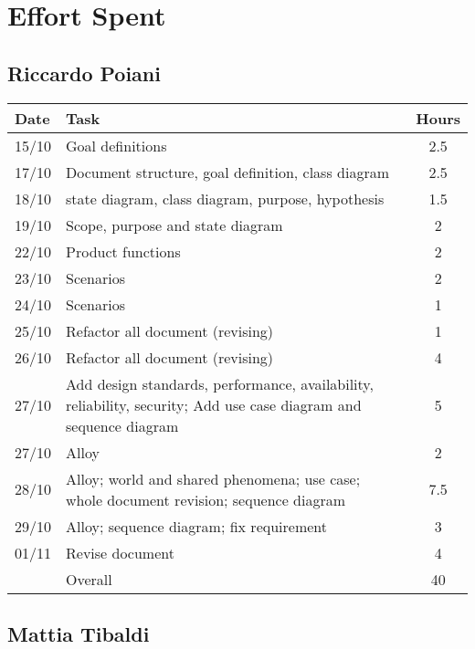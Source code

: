 \section{Effort Spent}

\subsection{Riccardo Poiani}

\begin{table}[H]
\begin{tabularx}{\textwidth}{|l|X|c|}
\hline
\rowcolor[HTML]{C0C0C0} 
Date & Task & Hours\\ \hline
15/10 & Goal definitions & 2.5\\ \hline
17/10 & Document structure, goal definition, class diagram & 2.5\\ \hline
18/10 & state diagram, class diagram, purpose, hypothesis & 1.5\\ \hline
19/10 & Scope, purpose and state diagram & 2\\ \hline
22/10 & Product functions & 2\\ \hline
23/10 & Scenarios & 2\\ \hline
24/10 & Scenarios & 1\\ \hline
25/10 & Refactor all document (revising) & 1\\ \hline
26/10 & Refactor all document (revising) & 4\\ \hline
27/10 & Add design standards, performance, availability, reliability, security; Add use case diagram and sequence diagram & 5\\ \hline
27/10 & Alloy & 2\\ \hline
28/10 & Alloy; world and shared phenomena; use case; whole document revision; sequence diagram & 7.5  \\ \hline
29/10 & Alloy; sequence diagram; fix requirement& 3 \\ \hline
01/11 & Revise document & 4 \\ \hline 
\rowcolor[HTML]{C0C0C0} 
& Overall & 40 \\ \hline
\end{tabularx}
\end{table}

\subsection{Mattia Tibaldi}

